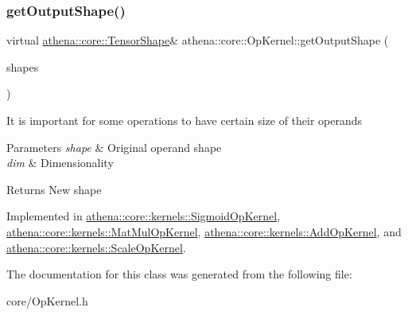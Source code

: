 \mbox{\label{classathena_1_1core_1_1_op_kernel_a926afa57c90b4a999419cbbdc0496c65}} 
\subsubsection{\texorpdfstring{get\+Output\+Shape()}{getOutputShape()}}
{\footnotesize\ttfamily virtual \mbox{\hyperlink{classathena_1_1core_1_1_tensor_shape}{athena\+::core\+::\+Tensor\+Shape}}\& athena\+::core\+::\+Op\+Kernel\+::get\+Output\+Shape (\begin{DoxyParamCaption}\item[{const std\+::vector$<$ \mbox{\hyperlink{classathena_1_1core_1_1_tensor_shape}{athena\+::core\+::\+Tensor\+Shape}} \& $>$ \&}]{shapes }\end{DoxyParamCaption})\hspace{0.3cm}{\ttfamily [pure virtual]}}

It is important for some operations to have certain size of their operands 
\begin{DoxyParams}{Parameters}
{\em shape} & Original operand shape \\
\hline
{\em dim} & Dimensionality \\
\hline
\end{DoxyParams}
\begin{DoxyReturn}{Returns}
New shape 
\end{DoxyReturn}


Implemented in \mbox{\hyperlink{classathena_1_1core_1_1kernels_1_1_sigmoid_op_kernel_a67e52f29a93f345ebf48801d835cef62}{athena\+::core\+::kernels\+::\+Sigmoid\+Op\+Kernel}}, \mbox{\hyperlink{classathena_1_1core_1_1kernels_1_1_mat_mul_op_kernel_a6bfb45669c7ebb74c32f8846a940c57a}{athena\+::core\+::kernels\+::\+Mat\+Mul\+Op\+Kernel}}, \mbox{\hyperlink{classathena_1_1core_1_1kernels_1_1_add_op_kernel_aaf21b2b72c6e601964e53eb6de7fccfd}{athena\+::core\+::kernels\+::\+Add\+Op\+Kernel}}, and \mbox{\hyperlink{classathena_1_1core_1_1kernels_1_1_scale_op_kernel_afdd5df13d53df932af26968714a2beed}{athena\+::core\+::kernels\+::\+Scale\+Op\+Kernel}}.



The documentation for this class was generated from the following file\+:\begin{DoxyCompactItemize}
\item 
core/Op\+Kernel.\+h\end{DoxyCompactItemize}
